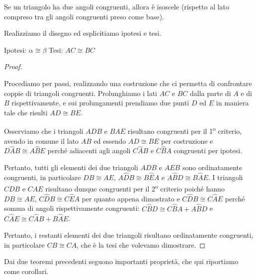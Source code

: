 \begin{teorema}
Se un triangolo ha due angoli congruenti, allora è isoscele (rispetto 
al lato compreso tra gli angoli congruenti preso come base).
\end{teorema}

Realizziamo il disegno ed esplicitiamo ipotesi e tesi.

\noindent Ipotesi: $\alpha\cong \beta$
\tab Tesi: $AC\cong BC$

\begin{proof}
\begin{multicols}{2}
Procediamo per passi, realizzando una costruzione che ci permetta di 
confrontare coppie di triangoli congruenti. Prolunghiamo i lati $AC$ 
e $BC$ dalla parte di $A$ e di $B$ rispettivamente, e sui 
prolungamenti prendiamo due punti $D$ ed $E$ in maniera tale che 
risulti $AD\cong BE$.

Osserviamo che i triangoli $ADB$ e $BAE$ risultano congruenti per il 
1\textsuperscript{o} criterio, avendo in comune il lato $AB$ ed 
essendo $AD\cong BE$ per costruzione e $D\widehat{A}B\cong 
A\widehat{B}E$ perché adiacenti agli angoli $C\widehat{A}B$ e 
$C\widehat{B}A$ congruenti per ipotesi. 
\begin{center}
\begin{inaccessibleblock}

\end{inaccessibleblock}
\end{center}
\end{multicols}

Pertanto, tutti gli elementi 
dei due triangoli $ADB$ e $AEB$ sono ordinatamente congruenti, in 
particolare $DB\cong AE$, $A\widehat{D}B\cong B\widehat{E}A$ e 
$A\widehat{B}D\cong B\widehat{A}E$.
I triangoli $CDB$ e $CAE$ risultano dunque congruenti per il 
2\textsuperscript{o} criterio poiché hanno $DB\cong AE$, 
$C\widehat{D}B\cong C\widehat{E}A$ per quanto appena dimostrato e 
$C\widehat{D}B\cong C\widehat{A}E$ perché somma di angoli 
rispettivamente congruenti: $C\widehat{B}D\cong C\widehat{B}A + 
A\widehat{B}D$ e $C\widehat{A}E\cong C\widehat{A}B + B\widehat{A}E$.

Pertanto, i restanti elementi dei due triangoli risultano 
ordinatamente congruenti, in particolare $CB\cong CA$, che è la tesi 
che volevamo dimostrare.
\end{proof}


Dai due teoremi precedenti seguono importanti proprietà, che qui 
riportiamo come corollari.

